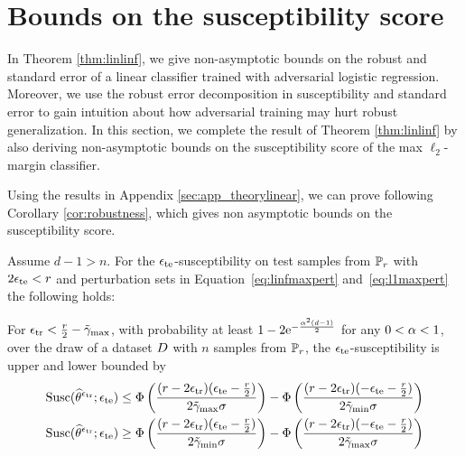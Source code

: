 \section{Bounds on the susceptibility score}
\label{app:susc}
In Theorem \ref{thm:linlinf}, we give non-asymptotic bounds on the robust and standard error of a linear classifier trained with adversarial logistic regression. Moreover, we use the robust error decomposition in susceptibility and standard error to gain intuition about how adversarial training may hurt robust generalization. In this section, we complete the result of Theorem \ref{thm:linlinf} by also deriving non-asymptotic bounds on the susceptibility score of the max $\ell_2$-margin classifier.

Using the results in Appendix \ref{sec:app_theorylinear}, we can prove following Corollary \ref{cor:robustness}, which gives non asymptotic bounds on the susceptibility score.
\begin{corollary}
\label{cor:robustness}
  Assume $d-1>n$. For the $\epsilon_{\text{te}}$-susceptibility on test samples from $\mathbb{P}_{r}$ with $2 \epsilon_{\text{te}} < r$ and perturbation sets in Equation~\eqref{eq:linfmaxpert} and~\eqref{eq:l1maxpert} the following holds:

For $\epsilon_{\text{tr}} < \frac{r}{2} - \tilde{\gamma}_{\max}$, with probability at least $1-2\text{e}^{-\frac{\alpha^2 (d-1)}{2}}$ for any $0<\alpha<1$, over the draw of a dataset $D$ with $n$ samples from $\mathbb{P}_{r}$, the $\epsilon_{\text{te}}$-susceptibility is upper and lower bounded by
  \begin{equation}
  \begin{split}
       &\text{Susc}(\widehat{\theta}^{\epsilon_{\text{tr}}};\epsilon_{\text{te}}) \leq \Phi \left(\frac{(r-2 \epsilon_{\text{tr}}) (\epsilon_{\text{te}} - \frac{r}{2})}{2 \tilde{\gamma}_{\max} \sigma}\right) - \Phi \left( \frac{(r-2 \epsilon_{\text{tr}})( -\epsilon_{\text{te}} - \frac{r}{2})}{2 \tilde{\gamma}_{\min}\sigma} \right)\\ 
       &\text{Susc}(\widehat{\theta}^{\epsilon_{\text{tr}}};\epsilon_{\text{te}}) \geq   \Phi \left(\frac{(r-2 \epsilon_{\text{tr}}) (\epsilon_{\text{te}} - \frac{r}{2})}{2 \tilde{\gamma}_{\min}\sigma}\right) - \Phi \left( \frac{(r-2 \epsilon_{\text{tr}})( -\epsilon_{\text{te}} - \frac{r}{2})}{2 \tilde{\gamma}_{\max} \sigma} \right)
        \end{split}
  \end{equation}
\end{corollary}

